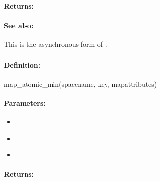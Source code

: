\paragraph{Returns:}


\paragraph{See also:}  This is the asynchronous form of .

\pagebreak
\subsubsection{}
\label{api:ruby:map_atomic_min}


\paragraph{Definition:}
\begin{rubycode}
map_atomic_min(spacename, key, mapattributes)
\end{rubycode}

\paragraph{Parameters:}
\begin{itemize}[noitemsep]
\item {}\\

\item {}\\

\item {}\\

\end{itemize}

\paragraph{Returns:}


\pagebreak
\subsubsection{}
\label{api:ruby:async_map_atomic_min}


